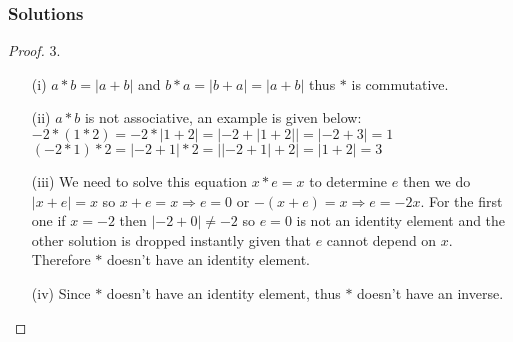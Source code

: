 \documentclass[11pt]{article}
\begin{document}
\subsubsection*{Solutions}
\begin{proof}{3.}
\begin{itemize}
\item [(i)] $a * b = \mathopen|a+b\mathclose|$ and $b * a = \mathopen|b+a\mathclose| = \mathopen|a+b\mathclose|$ thus $*$ is commutative.
\item [(ii)] $a*b$ is not associative, an example is given below: \\
$-2 * (1 * 2) = -2 * \mathopen|1+2\mathclose| = \mathopen|-2 + \mathopen|1+2\mathclose|\mathclose|= \mathopen|-2+3\mathclose|= 1$\\
$(-2 * 1) * 2 = \mathopen|-2+1\mathclose| * 2 = \mathopen|\mathopen|-2 + 1\mathclose| +2\mathclose|= \mathopen|1+2\mathclose|= 3$
\item [(iii)] We need to solve this equation $x*e=x$ to determine $e$ then we do $\mathopen|x+e\mathclose| =x$ so $x+e = x \Rightarrow e = 0$ or $-(x+e) = x \Rightarrow e = -2x$. For the first one if $x=-2$ then $\mathopen|-2+0\mathclose| \neq -2$ so $e=0$ is not an identity element and the other solution is dropped instantly given that $e$ cannot depend on $x$. Therefore $*$ doesn't have an identity element.
\item [(iv)] Since $*$ doesn't have an identity element, thus $*$ doesn't have an inverse. 
\end{itemize}
\end{proof}
\end{document}
